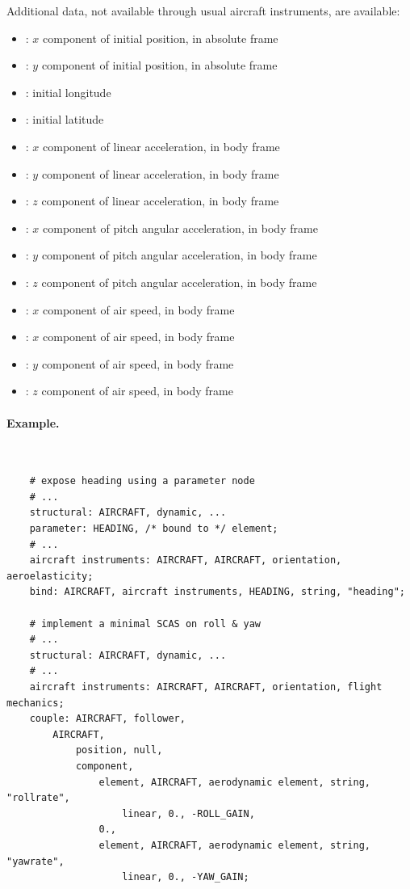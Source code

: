 Additional data, not available through usual aircraft instruments, are available:
\begin{itemize}
\item {}: $x$ component of initial position, in absolute frame
\item {}: $y$ component of initial position, in absolute frame
\item {}: initial longitude
\item {}: initial latitude
\item {}: $x$ component of linear acceleration, in body frame
\item {}: $y$ component of linear acceleration, in body frame
\item {}: $z$ component of linear acceleration, in body frame
\item {}: $x$ component of pitch angular acceleration, in body frame
\item {}: $y$ component of pitch angular acceleration, in body frame
\item {}: $z$ component of pitch angular acceleration, in body frame
\item {}: $x$ component of air speed, in body frame
\item {}: $x$ component of air speed, in body frame
\item {}: $y$ component of air speed, in body frame
\item {}: $z$ component of air speed, in body frame
\end{itemize}

\paragraph{Example.} \
\begin{verbatim}
    # expose heading using a parameter node
    # ...
    structural: AIRCRAFT, dynamic, ...
    parameter: HEADING, /* bound to */ element;
    # ...
    aircraft instruments: AIRCRAFT, AIRCRAFT, orientation, aeroelasticity;
    bind: AIRCRAFT, aircraft instruments, HEADING, string, "heading";

    # implement a minimal SCAS on roll & yaw
    # ...
    structural: AIRCRAFT, dynamic, ...
    # ...
    aircraft instruments: AIRCRAFT, AIRCRAFT, orientation, flight mechanics;
    couple: AIRCRAFT, follower,
        AIRCRAFT,
            position, null,
            component,
                element, AIRCRAFT, aerodynamic element, string, "rollrate",
                    linear, 0., -ROLL_GAIN,
                0.,
                element, AIRCRAFT, aerodynamic element, string, "yawrate",
                    linear, 0., -YAW_GAIN;
\end{verbatim}




